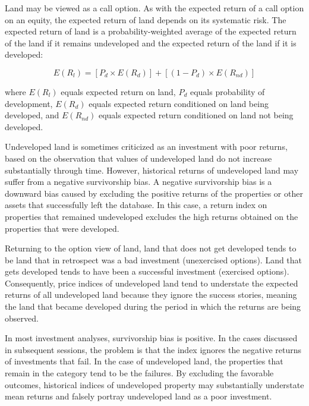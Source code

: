 \documentclass[11pt]{article}
\begin{document}
Land may be viewed as a call option. As with the expected return of a call option on an equity, the expected return of land depends on its systematic risk. The expected return of land is a probability-weighted average of the expected return of the land if it remains undeveloped and the expected return of the land if it is developed:

$$
E\left(R_{l}\right)=\left[P_{d} \times E\left(R_{d}\right)\right]+\left[\left(1-P_{d}\right) \times E\left(R_{n d}\right)\right]
$$

where $E\left(R_{l}\right)$ equals expected return on land, $P_{d}$ equals probability of development, $E\left(R_{d}\right)$ equals expected return conditioned on land being developed, and $E\left(R_{n d}\right)$ equals expected return conditioned on land not being developed.

Undeveloped land is sometimes criticized as an investment with poor returns, based on the observation that values of undeveloped land do not increase substantially through time. However, historical returns of undeveloped land may suffer from a negative survivorship bias. A negative survivorship bias is a downward bias caused by excluding the positive returns of the properties or other assets that successfully left the database. In this case, a return index on properties that remained undeveloped excludes the high returns obtained on the properties that were developed.

Returning to the option view of land, land that does not get developed tends to be land that in retrospect was a bad investment (unexercised options). Land that gets developed tends to have been a successful investment (exercised options). Consequently, price indices of undeveloped land tend to understate the expected returns of all undeveloped land because they ignore the success stories, meaning the land that became developed during the period in which the returns are being observed.

In most investment analyses, survivorship bias is positive. In the cases discussed in subsequent sessions, the problem is that the index ignores the negative returns of investments that fail. In the case of undeveloped land, the properties that remain in the category tend to be the failures. By excluding the favorable outcomes, historical indices of undeveloped property may substantially understate mean returns and falsely portray undeveloped land as a poor investment.
\end{document}
